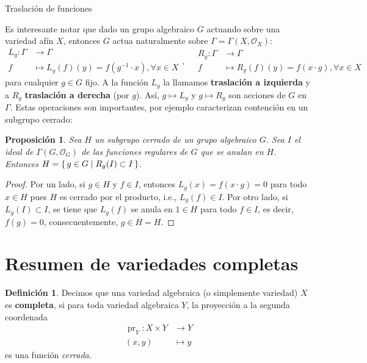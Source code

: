 \documentclass[spanish,10pt]{amsart}
\makeatletter
\renewcommand\subsection{\@startsection{subsection}{2}%
  \z@{.5\linespacing\@plus.7\linespacing}{-.5em}%
  {\normalfont\sffamily}}
\newtheorem{proposition}[theorem]{Proposición}
\theoremstyle{definition}
\newtheorem{definition}[theorem]{Definición}
\theoremstyle{remark}
\numberwithin{equation}{section}
\renewcommand{\bar}[1]{\overline{#1}}
\renewcommand{\O}{\mathcal{O}}
\makeatother
\begin{document}
\subsection{Traslación de funciones}

Es interesante notar que dado un grupo algebraico $G$ actuando sobre una variedad afín $X$, entonces $G$ actua naturalmente sobre $\Gamma = \Gamma (X, \O_X)$:
\[
    \begin{array}{rl}
    L_g : \Gamma &\longrightarrow \Gamma \\
f &\longmapsto L_g (f) (y) = f(g^{-1} \cdot x) , \forall x \in X
    \end{array}, \quad
    \begin{array}{rl}
    R_g : \Gamma &\longrightarrow \Gamma \\
f &\longmapsto R_g (f) (y) = f(x \cdot g) , \forall x \in X
    \end{array}
\]
para cualquier $g \in G$ fijo. A la función $L_g$ la llamamos \textbf{traslación a izquierda} y a $R_g$ \textbf{traslación a derecha} (por $g$). Así, $g \mapsto L_g$ y $g \mapsto R_g$ son acciones de $G$ en $\Gamma$. Estas operaciones son importantes, por ejemplo caracterizan contención en un subgrupo cerrado:

\begin{proposition}
Sea $H$ un subgrupo cerrado de un grupo algebraico $G$. Sea $I$ el ideal de $\Gamma (G, \O_G)$ de las funciones regulares de $G$ que se anulan en $H$. Entonces $H = \set{g \in G | R_g (I) \subset I}$.
\end{proposition}
\begin{proof}
Por un lado, si $g \in H$ y $f \in I$, entonces $L_g (x) = f(x \cdot g) = 0$ para todo $x \in H$ pues $H$ es cerrado por el producto, i.e., $L_g (f) \in I$. Por otro lado, si $L_g (I) \subset I$, se tiene que $L_g (f)$ se anula en $1 \in H$ para todo $f \in I$, es decir, $f(g) = 0$, consecuentemente, $g \in \bar H = H$.
\end{proof}









\section{Resumen de variedades completas}

\begin{definition}
Decimos que una variedad algebraica (o simplemente variedad) $X$ es \textbf{completa}, si para toda variedad algebraica $Y$, la proyección a la segunda coordenada
\begin{align*}
\operatorname{pr}_Y : X \times Y &\longrightarrow Y \\
(x,y) &\longmapsto y
\end{align*}
es una función \textit{cerrada}.
\end{definition}
\end{document}
